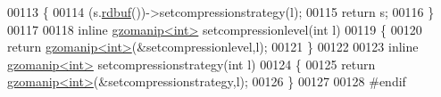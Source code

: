 \begin{DoxyCode}
00113 \{
00114   (s.\hyperlink{classgzofstream_a2fef74202b114357f41cfeb28f1d2acc}{rdbuf}())->setcompressionstrategy(l);
00115   \textcolor{keywordflow}{return} s;
00116 \}
00117 
00118 \textcolor{keyword}{inline} \hyperlink{classgzomanip}{gzomanip<int>} setcompressionlevel(\textcolor{keywordtype}{int} l)
00119 \{
00120   \textcolor{keywordflow}{return} \hyperlink{classgzomanip}{gzomanip<int>}(&setcompressionlevel,l);
00121 \}
00122 
00123 \textcolor{keyword}{inline} \hyperlink{classgzomanip}{gzomanip<int>} setcompressionstrategy(\textcolor{keywordtype}{int} l)
00124 \{
00125   \textcolor{keywordflow}{return} \hyperlink{classgzomanip}{gzomanip<int>}(&setcompressionstrategy,l);
00126 \}
00127 
00128 \textcolor{preprocessor}{#endif}
\end{DoxyCode}
